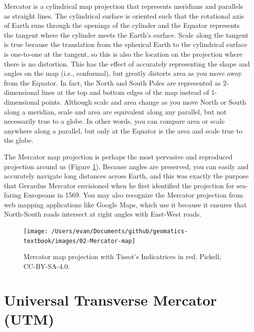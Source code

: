 \documentclass[
]{book}
\begin{document}
Mercator is a cylindrical map projection that represents meridians and parallels as straight lines. The cylindrical surface is oriented such that the rotational axis of Earth runs through the openings of the cylinder and the Equator represents the tangent where the cylinder meets the Earth's surface. Scale along the tangent is true because the translation from the spherical Earth to the cylindrical surface is one-to-one at the tangent, so this is also the location on the projection where there is no distortion. This has the effect of accurately representing the shape and angles on the map (i.e., conformal), but greatly distorts area as you move away from the Equator. In fact, the North and South Poles are represented as 2-dimensional lines at the top and bottom edges of the map instead of 1-dimensional points. Although scale and area change as you move North or South along a meridian, scale and area are equivalent along any parallel, but not necessarily true to a globe. In other words, you can compare area or scale anywhere along a parallel, but only at the Equator is the area and scale true to the globe.

The Mercator map projection is perhaps the most pervasive and reproduced projection around us (Figure \ref{fig:2-Mercator-map}). Because angles are preserved, you can easily and accurately navigate long distances across Earth, and this was exactly the purpose that Gerardus Mercator envisioned when he first identified the projection for sea-faring Europeans in 1569. You may also recognize the Mercator projection from web mapping applications like Google Maps, which use it because it ensures that North-South roads intersect at right angles with East-West roads.

\begin{figure}
\texttt{[image: /Users/evan/Documents/github/geomatics-textbook/images/02-Mercator-map]} \caption{Mercator map projection with Tissot's Indicatrices in red. Pickell, CC-BY-SA-4.0.}\label{fig:2-Mercator-map}
\end{figure}

\hypertarget{universal-transverse-mercator-utm}{%
\section{Universal Transverse Mercator (UTM)}\label{universal-transverse-mercator-utm}}
\end{document}
